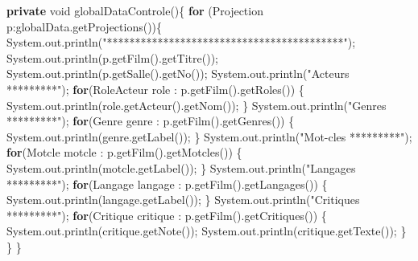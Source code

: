 \documentclass[]{article}
\newenvironment{Shaded}{}{}
\newcommand{\KeywordTok}[1]{\textcolor[rgb]{0.00,0.44,0.13}{\textbf{{#1}}}}
\newcommand{\DataTypeTok}[1]{\textcolor[rgb]{0.56,0.13,0.00}{{#1}}}
\newcommand{\StringTok}[1]{\textcolor[rgb]{0.25,0.44,0.63}{{#1}}}
\newcommand{\FunctionTok}[1]{\textcolor[rgb]{0.02,0.16,0.49}{{#1}}}
\newcommand{\BuiltInTok}[1]{{#1}}
\newcommand{\NormalTok}[1]{{#1}}
\begin{document}
\begin{Shaded}
\begin{Highlighting}[]
	\KeywordTok{private} \DataTypeTok{void} \FunctionTok{globalDataControle}\NormalTok{()\{}
		\KeywordTok{for} \NormalTok{(Projection p:globalData.}\FunctionTok{getProjections}\NormalTok{())\{}
			\BuiltInTok{System}\NormalTok{.}\FunctionTok{out}\NormalTok{.}\FunctionTok{println}\NormalTok{(}\StringTok{"******************************************"}\NormalTok{);}
			\BuiltInTok{System}\NormalTok{.}\FunctionTok{out}\NormalTok{.}\FunctionTok{println}\NormalTok{(p.}\FunctionTok{getFilm}\NormalTok{().}\FunctionTok{getTitre}\NormalTok{());}
			\BuiltInTok{System}\NormalTok{.}\FunctionTok{out}\NormalTok{.}\FunctionTok{println}\NormalTok{(p.}\FunctionTok{getSalle}\NormalTok{().}\FunctionTok{getNo}\NormalTok{());}
			\BuiltInTok{System}\NormalTok{.}\FunctionTok{out}\NormalTok{.}\FunctionTok{println}\NormalTok{(}\StringTok{"Acteurs *********"}\NormalTok{);}
			\KeywordTok{for}\NormalTok{(RoleActeur role : p.}\FunctionTok{getFilm}\NormalTok{().}\FunctionTok{getRoles}\NormalTok{()) \{}
				\BuiltInTok{System}\NormalTok{.}\FunctionTok{out}\NormalTok{.}\FunctionTok{println}\NormalTok{(role.}\FunctionTok{getActeur}\NormalTok{().}\FunctionTok{getNom}\NormalTok{());}
			\NormalTok{\}}
			\BuiltInTok{System}\NormalTok{.}\FunctionTok{out}\NormalTok{.}\FunctionTok{println}\NormalTok{(}\StringTok{"Genres *********"}\NormalTok{);}
			\KeywordTok{for}\NormalTok{(Genre genre : p.}\FunctionTok{getFilm}\NormalTok{().}\FunctionTok{getGenres}\NormalTok{()) \{}
				\BuiltInTok{System}\NormalTok{.}\FunctionTok{out}\NormalTok{.}\FunctionTok{println}\NormalTok{(genre.}\FunctionTok{getLabel}\NormalTok{());}
			\NormalTok{\}}
			\BuiltInTok{System}\NormalTok{.}\FunctionTok{out}\NormalTok{.}\FunctionTok{println}\NormalTok{(}\StringTok{"Mot-cles *********"}\NormalTok{);}
			\KeywordTok{for}\NormalTok{(Motcle motcle : p.}\FunctionTok{getFilm}\NormalTok{().}\FunctionTok{getMotcles}\NormalTok{()) \{}
				\BuiltInTok{System}\NormalTok{.}\FunctionTok{out}\NormalTok{.}\FunctionTok{println}\NormalTok{(motcle.}\FunctionTok{getLabel}\NormalTok{());}
			\NormalTok{\}}
			\BuiltInTok{System}\NormalTok{.}\FunctionTok{out}\NormalTok{.}\FunctionTok{println}\NormalTok{(}\StringTok{"Langages *********"}\NormalTok{);}
			\KeywordTok{for}\NormalTok{(Langage langage : p.}\FunctionTok{getFilm}\NormalTok{().}\FunctionTok{getLangages}\NormalTok{()) \{}
				\BuiltInTok{System}\NormalTok{.}\FunctionTok{out}\NormalTok{.}\FunctionTok{println}\NormalTok{(langage.}\FunctionTok{getLabel}\NormalTok{());}
			\NormalTok{\}}
			\BuiltInTok{System}\NormalTok{.}\FunctionTok{out}\NormalTok{.}\FunctionTok{println}\NormalTok{(}\StringTok{"Critiques *********"}\NormalTok{);}
			\KeywordTok{for}\NormalTok{(Critique critique : p.}\FunctionTok{getFilm}\NormalTok{().}\FunctionTok{getCritiques}\NormalTok{()) \{}
				\BuiltInTok{System}\NormalTok{.}\FunctionTok{out}\NormalTok{.}\FunctionTok{println}\NormalTok{(critique.}\FunctionTok{getNote}\NormalTok{());}
				\BuiltInTok{System}\NormalTok{.}\FunctionTok{out}\NormalTok{.}\FunctionTok{println}\NormalTok{(critique.}\FunctionTok{getTexte}\NormalTok{());}
			\NormalTok{\}}
		\NormalTok{\}}
	\NormalTok{\}}


\end{Highlighting}
\end{Shaded}
\end{document}
